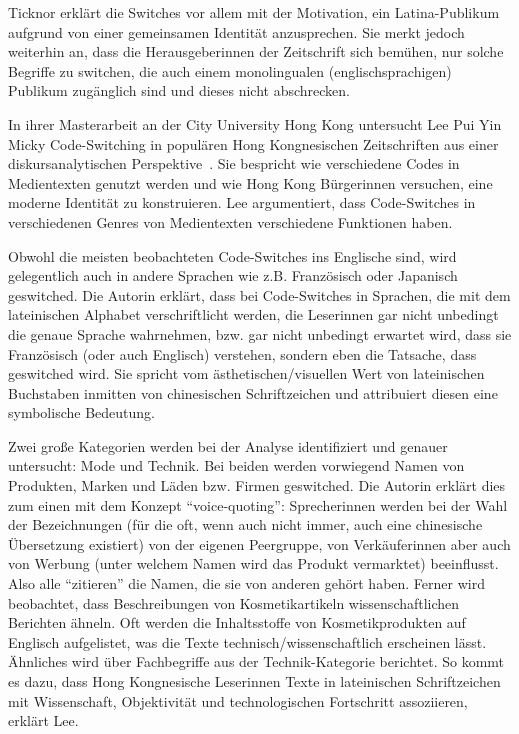 Ticknor erklärt die Switches vor allem mit der Motivation, ein Latina-Publikum aufgrund von einer gemeinsamen Identität anzusprechen.
Sie merkt jedoch weiterhin an, dass die Herausgeberinnen der Zeitschrift sich bemühen, nur solche Begriffe zu switchen, die auch einem monolingualen (englischsprachigen) Publikum zugänglich sind und dieses nicht abschrecken.



In ihrer Masterarbeit an der City University Hong Kong untersucht Lee Pui Yin Micky Code-Switching in populären Hong Kongnesischen Zeitschriften aus einer diskursanalytischen Perspektive~\cite[]{Lee99}.
Sie bespricht wie verschiedene Codes in Medientexten genutzt werden und wie Hong Kong Bürgerinnen versuchen, eine moderne Identität zu konstruieren.
Lee argumentiert, dass Code-Switches in verschiedenen Genres von Medientexten verschiedene Funktionen haben.

Obwohl die meisten beobachteten Code-Switches ins Englische sind, wird gelegentlich auch in andere Sprachen wie z.B. Französisch oder Japanisch geswitched.
Die Autorin erklärt, dass bei Code-Switches in Sprachen, die mit dem lateinischen Alphabet verschriftlicht werden, die Leserinnen gar nicht unbedingt die genaue Sprache wahrnehmen, bzw. gar nicht unbedingt erwartet wird, dass sie Französisch (oder auch Englisch) verstehen, sondern eben die Tatsache, dass geswitched wird.
Sie spricht vom ästhetischen/visuellen Wert von lateinischen Buchstaben inmitten von chinesischen Schriftzeichen und attribuiert diesen eine symbolische Bedeutung.

Zwei große Kategorien werden bei der Analyse identifiziert und genauer untersucht: Mode und Technik.
Bei beiden werden vorwiegend Namen von Produkten, Marken und Läden bzw. Firmen geswitched.
Die Autorin erklärt dies zum einen mit dem Konzept ``voice-quoting'': Sprecherinnen werden bei der Wahl der Bezeichnungen (für die oft, wenn auch nicht immer, auch eine chinesische Übersetzung existiert) von der eigenen Peergruppe, von Verkäuferinnen aber auch von Werbung (unter welchem Namen wird das Produkt vermarktet) beeinflusst.
Also alle ``zitieren'' die Namen, die sie von anderen gehört haben.
Ferner wird beobachtet, dass Beschreibungen von Kosmetikartikeln wissenschaftlichen Berichten ähneln.
Oft werden die Inhaltsstoffe von Kosmetikprodukten auf Englisch aufgelistet, was die Texte technisch/wissenschaftlich erscheinen lässt.
Ähnliches wird über Fachbegriffe aus der Technik-Kategorie berichtet.
So kommt es dazu, dass Hong Kongnesische Leserinnen Texte in lateinischen Schriftzeichen mit Wissenschaft, Objektivität und technologischen Fortschritt assoziieren, erklärt Lee.


